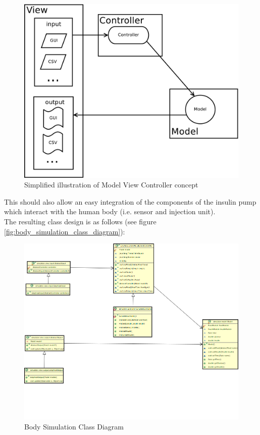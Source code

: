 \documentclass[pdflatex,a4paper,11pt,english]{scrreprt}
\begin{document}
\begin{figure}[htb]
\centering
\includegraphics[scale=0.4]{images/mvc_simplified}
\caption{Simplified illustration of Model View Controller concept}
\label{fig:mvc_simplified}
\end{figure}

This should also allow an easy integration of the components of the insulin pump which interact with the human body (i.e. sensor and injection unit). \\
The resulting class design is as follows  (see figure
\vref{fig:body_simulation_class_diagram}): 

\begin{landscape}
\begin{figure}[htb]
\centering
\includegraphics[width=\textwidth]{images/body_simulation_classdiagram}
\caption{Body Simulation Class Diagram}
\label{fig:body_simulation_class_diagram}
\end{figure}
\end{landscape}
\end{document}
